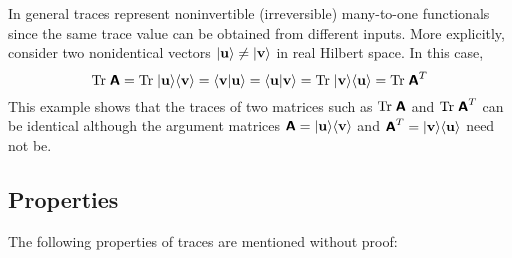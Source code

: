 In general traces represent noninvertible (irreversible) many-to-one functionals
since the same trace value can be obtained from different inputs.
More explicitly, consider two nonidentical vectors  $\vert {\bf u} \rangle \neq \vert {\bf v} \rangle$ in real Hilbert space.
In this case,
\begin{equation}
\textrm{Tr}\;\textsf{\textbf{A}} =
\textrm{Tr}\;\vert {\bf u} \rangle \langle {\bf v} \rangle =
\langle {\bf v} \vert  {\bf u} \rangle
=
\langle {\bf u} \vert  {\bf v} \rangle =
\textrm{Tr}\;\vert {\bf v} \rangle \langle {\bf u} \rangle =
\textrm{Tr}\;\textsf{\textbf{A}}^T
\end{equation}
This example shows that the traces of two matrices such as $\textrm{Tr}\;\textsf{\textbf{A}}$ and $\textrm{Tr}\;\textsf{\textbf{A}}^T$ can be identical although
the argument matrices  $\textsf{\textbf{A}}=\vert {\bf u} \rangle \langle {\bf v} \rangle
$ and $\textsf{\textbf{A}}^T = \vert {\bf v} \rangle \langle {\bf u} \rangle$ need not be.

\subsection{Properties}

The following properties of traces are mentioned without proof:

